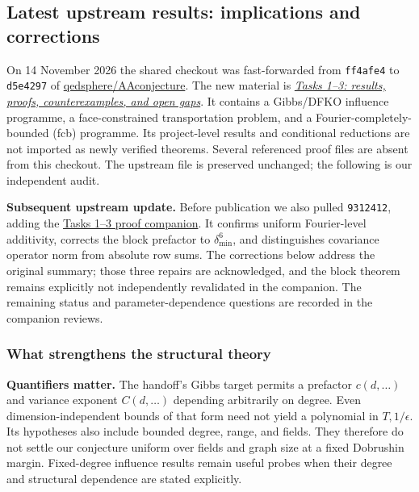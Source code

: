\subsection{Latest upstream results: implications and corrections}
\label{tht:upstream}

On 14 November 2026 the shared checkout was fast-forwarded from
\texttt{ff4afe4} to \texttt{d5e4297} of
\href{https://github.com/qedsphere/AAconjecture}{qedsphere/AAconjecture}.
The new material is
\href{https://github.com/qedsphere/AAconjecture/blob/d5e429763b9f0234f5dd02c3fe03925c78b4306c/tasks-1-2-3-summary.md}
{\emph{Tasks 1--3: results, proofs, counterexamples, and open gaps}}.
It contains a Gibbs/DFKO influence programme, a face-constrained
transportation problem, and a Fourier-completely-bounded (fcb) programme.
Its project-level results and conditional reductions are not imported
as newly verified theorems. Several referenced proof files are absent
from this checkout. The upstream file is preserved unchanged; the
following is our independent audit.

\textbf{Subsequent upstream update.} Before publication we also pulled
\texttt{9312412}, adding the
\href{https://github.com/qedsphere/AAconjecture/blob/9312412/tasks-1-2-3-proof-companion.md}
{Tasks 1--3 proof companion}. It confirms uniform Fourier-level
additivity, corrects the block prefactor to $\delta_{\min}^{6}$, and
distinguishes covariance operator norm from absolute row sums. The
corrections below address the original summary; those three repairs
are acknowledged, and the block theorem remains explicitly not
independently revalidated in the companion. The remaining status and
parameter-dependence questions are recorded in the companion reviews.

\subsubsection{What strengthens the structural theory}

\textbf{Quantifiers matter.} The handoff's Gibbs target permits a
prefactor $c(d,\ldots)$ and variance exponent $C(d,\ldots)$ depending
arbitrarily on degree. Even dimension-independent bounds of that form
need not yield a polynomial in $T,1/\epsilon$. Its hypotheses also
include bounded degree, range, and fields. They therefore do not settle
our conjecture uniform over fields and graph size at a fixed Dobrushin
margin. Fixed-degree influence results remain useful probes when their
degree and structural dependence are stated explicitly.

